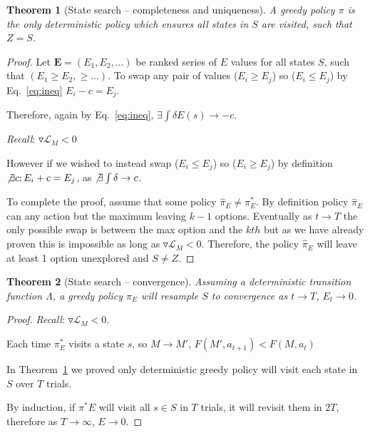 \documentclass[10pt,letterpaper]{article}
\newtheorem{theorem}{Theorem}
\begin{document}
\begin{theorem}[State search -- completeness and uniqueness] \label{theorem:Z}
A greedy policy $\pi$ is the only deterministic policy which ensures all states in $S$ are visited, such that $Z = S$.
\end{theorem}
\begin{proof}    
    Let $\mathbf{E} = (E_1, E_2, ...)$ be ranked series of $E$ values for all states $S$, such that $(E_1 \geq E_2, \geq ...)$. To swap any pair of values ($E_i \geq E_j$) so ($E_i \leq E_j$) by Eq.~\ref{eq:ineq} $E_i - c = E_j$.  

    Therefore, again by Eq.~\ref{eq:ineq}, $\exists \int \delta E(s) \rightarrow -c$. 

    \textit{Recall}: $\triangledown \mathcal{L}_M < 0$

    However if we wished to instead swap ($E_i \leq E_j$) so ($E_i \geq E_j$) by definition $\not \exists c; E_i + c = E_j$, as $\not \exists \int \delta \rightarrow c$. 

    To complete the proof, assume that some policy $\hat \pi_E \neq \pi^*_E$. By definition policy $\hat \pi_E$ can any action but the maximum leaving $k-1$ options. Eventually as $t \rightarrow T$ the only possible swap is between the max option and the $kth$ but as we have already proven this is impossible as long as $\triangledown \mathcal{L}_M < 0$. Therefore, the policy $\hat \pi_E$ will leave at least 1 option unexplored and $S \neq Z$.
\end{proof}

\begin{theorem}[State search -- convergence] \label{theorem:convergence}
    Assuming a deterministic transition function $\Lambda$, a greedy policy $\pi_E$ will resample $S$ to convergence as $t \rightarrow T$, $E_t \rightarrow 0$.
\end{theorem}
\begin{proof}
    \textit{Recall}: $\triangledown \mathcal{L}_M < 0$. 

    Each time $\pi^*_E$ visits a state $s$, so $M \rightarrow M'$, $F(M', a_{t+1}) < F(M, a_t)$

    In Theorem~\ref{theorem:Z} we proved only deterministic greedy policy will visit each state in $S$ over $T$ trials.
    
    By induction, if $\pi^*E$ will visit all $s \in S$ in $T$ trials, it will revisit them in $2T$, therefore as $T \rightarrow \infty$, $E \rightarrow 0$. 
\end{proof}
\end{document}
